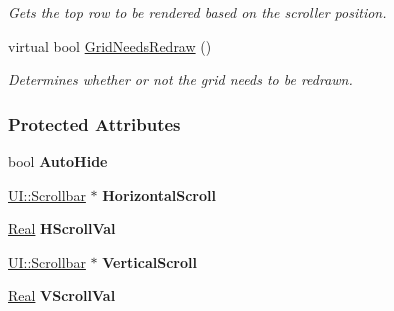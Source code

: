 \begin{DoxyCompactItemize}
\begin{DoxyCompactList}\small\item\em Gets the top row to be rendered based on the scroller position. \item\end{DoxyCompactList}\item 
\hypertarget{classphys_1_1UI_1_1ScrolledCellGrid_a726ac5925e2b13110ac7bc92788904e0}{
virtual bool \hyperlink{classphys_1_1UI_1_1ScrolledCellGrid_a726ac5925e2b13110ac7bc92788904e0}{GridNeedsRedraw} ()}
\label{classphys_1_1UI_1_1ScrolledCellGrid_a726ac5925e2b13110ac7bc92788904e0}

\begin{DoxyCompactList}\small\item\em Determines whether or not the grid needs to be redrawn. \item\end{DoxyCompactList}\end{DoxyCompactItemize}
\subsubsection*{Protected Attributes}
\begin{DoxyCompactItemize}
\item 
\hypertarget{classphys_1_1UI_1_1ScrolledCellGrid_a07339986f5695fbaf9ef25a584c1d28f}{
bool {\bfseries AutoHide}}
\label{classphys_1_1UI_1_1ScrolledCellGrid_a07339986f5695fbaf9ef25a584c1d28f}

\item 
\hypertarget{classphys_1_1UI_1_1ScrolledCellGrid_ae979ab2f4889db9517317cc0cf3e37f9}{
\hyperlink{classphys_1_1UI_1_1Scrollbar}{UI::Scrollbar} $\ast$ {\bfseries HorizontalScroll}}
\label{classphys_1_1UI_1_1ScrolledCellGrid_ae979ab2f4889db9517317cc0cf3e37f9}

\item 
\hypertarget{classphys_1_1UI_1_1ScrolledCellGrid_a0621569548639e6293a4023f4f90f909}{
\hyperlink{namespacephys_af7eb897198d265b8e868f45240230d5f}{Real} {\bfseries HScrollVal}}
\label{classphys_1_1UI_1_1ScrolledCellGrid_a0621569548639e6293a4023f4f90f909}

\item 
\hypertarget{classphys_1_1UI_1_1ScrolledCellGrid_a8bb7423d7d222b977d777098f7fb3217}{
\hyperlink{classphys_1_1UI_1_1Scrollbar}{UI::Scrollbar} $\ast$ {\bfseries VerticalScroll}}
\label{classphys_1_1UI_1_1ScrolledCellGrid_a8bb7423d7d222b977d777098f7fb3217}

\item 
\hypertarget{classphys_1_1UI_1_1ScrolledCellGrid_a87f8e96ba30a29c6f466c06ba7f06b91}{
\hyperlink{namespacephys_af7eb897198d265b8e868f45240230d5f}{Real} {\bfseries VScrollVal}}
\label{classphys_1_1UI_1_1ScrolledCellGrid_a87f8e96ba30a29c6f466c06ba7f06b91}

\end{DoxyCompactItemize}


